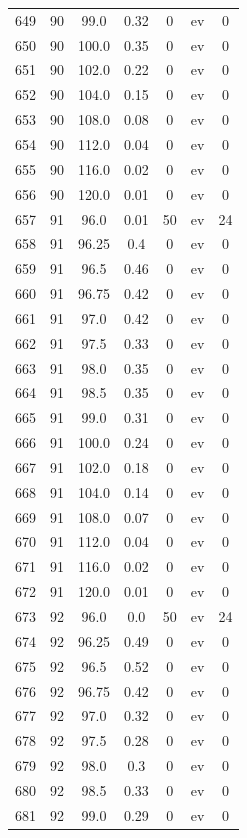 \documentclass[12pt,a4paper]{article}
\begin{document}
\begin{tabular}{r|cccccc}
	649 & 90 & 99.0 & 0.32 & 0 & ev & 0 \\
	650 & 90 & 100.0 & 0.35 & 0 & ev & 0 \\
	651 & 90 & 102.0 & 0.22 & 0 & ev & 0 \\
	652 & 90 & 104.0 & 0.15 & 0 & ev & 0 \\
	653 & 90 & 108.0 & 0.08 & 0 & ev & 0 \\
	654 & 90 & 112.0 & 0.04 & 0 & ev & 0 \\
	655 & 90 & 116.0 & 0.02 & 0 & ev & 0 \\
	656 & 90 & 120.0 & 0.01 & 0 & ev & 0 \\
	657 & 91 & 96.0 & 0.01 & 50 & ev & 24 \\
	658 & 91 & 96.25 & 0.4 & 0 & ev & 0 \\
	659 & 91 & 96.5 & 0.46 & 0 & ev & 0 \\
	660 & 91 & 96.75 & 0.42 & 0 & ev & 0 \\
	661 & 91 & 97.0 & 0.42 & 0 & ev & 0 \\
	662 & 91 & 97.5 & 0.33 & 0 & ev & 0 \\
	663 & 91 & 98.0 & 0.35 & 0 & ev & 0 \\
	664 & 91 & 98.5 & 0.35 & 0 & ev & 0 \\
	665 & 91 & 99.0 & 0.31 & 0 & ev & 0 \\
	666 & 91 & 100.0 & 0.24 & 0 & ev & 0 \\
	667 & 91 & 102.0 & 0.18 & 0 & ev & 0 \\
	668 & 91 & 104.0 & 0.14 & 0 & ev & 0 \\
	669 & 91 & 108.0 & 0.07 & 0 & ev & 0 \\
	670 & 91 & 112.0 & 0.04 & 0 & ev & 0 \\
	671 & 91 & 116.0 & 0.02 & 0 & ev & 0 \\
	672 & 91 & 120.0 & 0.01 & 0 & ev & 0 \\
	673 & 92 & 96.0 & 0.0 & 50 & ev & 24 \\
	674 & 92 & 96.25 & 0.49 & 0 & ev & 0 \\
	675 & 92 & 96.5 & 0.52 & 0 & ev & 0 \\
	676 & 92 & 96.75 & 0.42 & 0 & ev & 0 \\
	677 & 92 & 97.0 & 0.32 & 0 & ev & 0 \\
	678 & 92 & 97.5 & 0.28 & 0 & ev & 0 \\
	679 & 92 & 98.0 & 0.3 & 0 & ev & 0 \\
	680 & 92 & 98.5 & 0.33 & 0 & ev & 0 \\
	681 & 92 & 99.0 & 0.29 & 0 & ev & 0 \\

\end{tabular}
\end{document}
